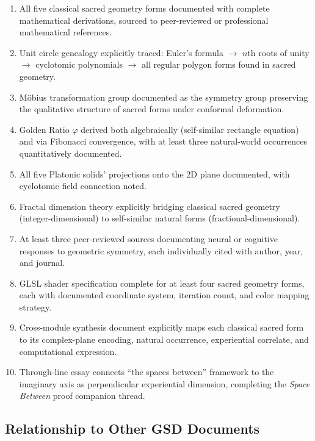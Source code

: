 \documentclass[11pt,letterpaper]{article}
\begin{document}
\begin{enumerate}
  \item All five classical sacred geometry forms documented with complete mathematical derivations, sourced to peer-reviewed or professional mathematical references.
  \item Unit circle genealogy explicitly traced: Euler's formula $\to$ $n$th roots of unity $\to$ cyclotomic polynomials $\to$ all regular polygon forms found in sacred geometry.
  \item M\"{o}bius transformation group documented as the symmetry group preserving the qualitative structure of sacred forms under conformal deformation.
  \item Golden Ratio $\varphi$ derived both algebraically (self-similar rectangle equation) and via Fibonacci convergence, with at least three natural-world occurrences quantitatively documented.
  \item All five Platonic solids' projections onto the 2D plane documented, with cyclotomic field connection noted.
  \item Fractal dimension theory explicitly bridging classical sacred geometry (integer-dimensional) to self-similar natural forms (fractional-dimensional).
  \item At least three peer-reviewed sources documenting neural or cognitive responses to geometric symmetry, each individually cited with author, year, and journal.
  \item GLSL shader specification complete for at least four sacred geometry forms, each with documented coordinate system, iteration count, and color mapping strategy.
  \item Cross-module synthesis document explicitly maps each classical sacred form to its complex-plane encoding, natural occurrence, experiential correlate, and computational expression.
  \item Through-line essay connects ``the spaces between'' framework to the imaginary axis as perpendicular experiential dimension, completing the \textit{Space Between} proof companion thread.
\end{enumerate}

\subsection{Relationship to Other GSD Documents}
\end{document}
